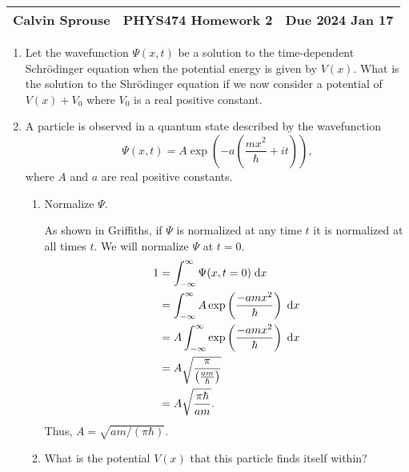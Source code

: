 \documentclass[a4paper, 12pt]{config/homework}
\begin{document}
\noindent
\begin{tabularx}{\textwidth}{>{\centering\arraybackslash}X>{\centering\arraybackslash}X>{\centering\arraybackslash}X}
Calvin Sprouse & PHYS474 Homework 2 & Due 2024 Jan 17\\
\midrule
\end{tabularx}

\begin{enumerate}
\item Let the wavefunction \(\Psi(x,t)\) be a solution to the time-dependent Schr{\"o}dinger equation when the potential energy is given by \(V(x)\). What is the solution to the Shr{\"o}dinger equation if we now consider a potential of \(V(x) + V_0\) where \(V_0\) is a real positive constant.

\pagebreak
\item A particle is observed in a quantum state described by the wavefunction
\[\Psi(x,t) = A\exp\left(-a\left(\frac{mx^2}{\hbar}+it\right)\right),\]
where \(A\) and \(a\) are real positive constants.
\begin{enumerate}[label=(\alph*)]
\item Normalize \(\Psi \).

As shown in Griffiths, if \(\Psi\) is normalized at any time \(t\) it is normalized at all times \(t\). We will normalize \(\Psi\) at \(t=0\).
\begin{align*}
1 &= \bint{-\infty}{\infty}{\Psi(x,t=0)}{x}
\\&= \bint{-\infty}{\infty}{A\exp\left(\frac{-amx^2}{\hbar}\right)}{x}
\\&= A \bint{-\infty}{\infty}{\exp\left(\frac{-amx^2}{\hbar}\right)}{x}
\\&= A \sqrt{\frac{\pi}{\left(\frac{am}{\hbar}\right)}}
\\&= A \sqrt{\frac{\pi\hbar}{am}}.
\end{align*}
Thus, \(A = \sqrt{am / (\pi\hbar)}\).

\pagebreak
\item What is the potential \(V(x)\) that this particle finds itself within?


\end{enumerate}
\end{enumerate}
\end{document}
